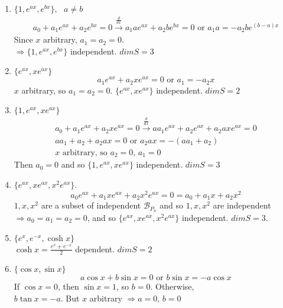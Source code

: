 \documentclass[twoside]{amsart}
\theoremstyle{plain}
\theoremstyle{definition}
\newcommand{\exercisehead}[1]
  {
   \noindent{\small\bf Exercise #1.}
   \smallskip}
\begin{document}
\exercisehead{23}
\begin{enumerate}
\item $\{ 1, e^{ax}, e^{bx} \}$, \, $a \neq b$ 
\[
\begin{gathered}
a_0 + a_1 e^{ax} + a_2 e^{bx} =0 \xrightarrow{ \frac{d}{dx} } a_1 a e^{ax} + a_2 be^{bx} = 0  \text{ or } a_1 a = -a_2 b e^{(b-a)x}
\end{gathered}
\]
Since $x$ arbitrary, $a_1 = a_2 = 0$.  \\
$\Longrightarrow \{ 1, e^{ax}, e^{bx} \}$ independent.  $\boxed{ dim{S} = 3 }$
\item $\{ e^{ax}, xe^{ax} \}$
\[
a_1 e^{ax} + a_2 xe^{ax} = 0 \text{ or } a_1 = -a_2 x
\]
$x$ arbitrary, so $a_1 = a_2 = 0$.  $\{ e^{ax}, xe^{ax} \}$ independent.  $\boxed{ dim{S} = 2 }$
\item $\{ 1, e^{ax}, xe^{ax} \}$
\[
\begin{gathered}
  a_0 + a_1 e^{ax} + a_2 xe^{ax} = 0 \xrightarrow{ \frac{d}{dx} } aa_1 e^{ax} + a_2 e^{ax} + a_2 a x e^{ax} = 0 \\
  aa_1 + a_2 + a_2 ax = 0 \text{ or } a_2 ax = -(aa_1 + a_2) \\
  x \text{ arbitrary, so } a_2 = 0, \, a_1 =0 
\end{gathered}
\]
Then $a_0 =0$ and so $\{ 1, e^{ax}, x e^{ax} \}$ independent.  $\boxed{ dim{S} = 3}$
\item $\{ e^{ax}, xe^{ax}, x^2 e^{ax} \}$.  
\[
a_0 e^{ax} + a_1 xe^{ax} + a_2 x^2 e^{ax} = 0 = a_0 + a_1 x + a_2 x^2
\]
$1,x,x^2$ are a subset of independent $\mathcal{B}_{P_n}$ and so $1,x,x^2$ are independent $\Longrightarrow a_0 = a_1 = a_2 =0$, and so $\{ e^{ax}, xe^{ax}, x^2 e^{ax} \}$ independent.  $\boxed{ dim{S} = 3}$.  
\item $\{ e^x, e^{-x}, \cosh{x} \}$ \\
  $\cosh{x} = \frac{e^x + e^{-x} }{ 2}$ dependent.  $\boxed{ dim{S} = 2}$
\item $\{ \cos{x}, \sin{x} \}$ 
\[
a\cos{x} + b\sin{x} =0 \text{ or } b\sin{x} = -a \cos{x}
\]
If $\cos{x} = 0$, then $\sin{x} = 1$, so $b=0$.  Otherwise, \\
$b\tan{x} = -a$.  But $x$ arbitrary $\Longrightarrow a=0, \, b =0$ 


\end{enumerate}
\end{document}
